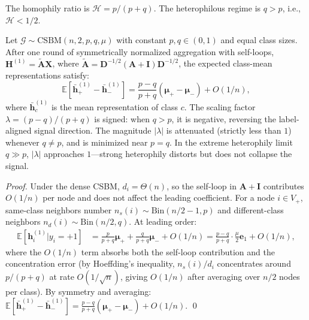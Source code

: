\documentclass[runningheads]{llncs}
\newcommand{\E}{\mathbb{E}}
\newcommand{\G}{\mathcal{G}}
\newcommand{\bh}{\mathbf{h}}
\begin{document}
The homophily ratio is $\mathcal{H} = p/(p + q)$.
The heterophilous regime is $q > p$, i.e., $\mathcal{H} < 1/2$.

\begin{theorem}\label{thm:degradation}

\noindent Let $\G \sim \mathrm{CSBM}(n, 2, p, q, \mu)$ with constant $p, q \in (0,1)$ and equal class sizes.
After one round of symmetrically normalized aggregation with self-loops, $\mathbf{H}^{(1)} = \tilde{\mathbf{A}} \mathbf{X}$, where $\tilde{\mathbf{A}} = \mathbf{D}^{-1/2}(\mathbf{A}+\mathbf{I})\mathbf{D}^{-1/2}$, the expected class-mean representations satisfy:
\begin{equation}
    \E[\bar{\bh}_+^{(1)} - \bar{\bh}_-^{(1)}] = \frac{p-q}{p+q}(\boldsymbol{\mu}_+ - \boldsymbol{\mu}_-) + O(1/n),
\end{equation}
where $\bar{\bh}_c^{(1)}$ is the mean representation of class $c$.
The scaling factor $\lambda = (p-q)/(p+q)$ is signed: when $q > p$, it is negative, reversing the label-aligned signal direction.
The magnitude $|\lambda|$ is attenuated (strictly less than $1$) whenever $q \neq p$, and is minimized near $p = q$.
In the extreme heterophily limit $q \gg p$, $|\lambda|$ approaches $1$---strong heterophily distorts but does not collapse the signal.
\end{theorem}

\begin{proof}
Under the dense CSBM, $d_i = \Theta(n)$, so the self-loop in $\mathbf{A}+\mathbf{I}$ contributes $O(1/n)$ per node and does not affect the leading coefficient.
For a node $i \in V_+$, same-class neighbors number $n_s(i) \sim \mathrm{Bin}(n/2-1, p)$ and different-class neighbors $n_d(i) \sim \mathrm{Bin}(n/2, q)$.
At leading order:
\begin{align}
    \E[\bh_i^{(1)} | y_i = +1] &= \frac{p}{p+q}\boldsymbol{\mu}_+ + \frac{q}{p+q}\boldsymbol{\mu}_- + O(1/n) = \frac{p-q}{p+q} \cdot \frac{\mu}{2}\mathbf{e}_1 + O(1/n),
\end{align}
where the $O(1/n)$ term absorbs both the self-loop contribution and the concentration error (by Hoeffding's inequality, $n_s(i)/d_i$ concentrates around $p/(p+q)$ at rate $O(1/\sqrt{n})$, giving $O(1/n)$ after averaging over $n/2$ nodes per class).
By symmetry and averaging: $\E[\bar{\bh}_+^{(1)} - \bar{\bh}_-^{(1)}] = \frac{p-q}{p+q}(\boldsymbol{\mu}_+ - \boldsymbol{\mu}_-) + O(1/n)$. \qed
\end{proof}
\end{document}
